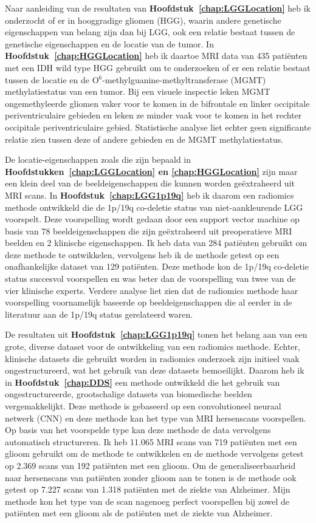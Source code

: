 Naar aanleiding van de resultaten van \textbf{Hoofdstuk~\ref{chap:LGGLocation}} heb ik onderzocht of er in hooggradige gliomen (HGG), waarin andere genetische eigenschappen van belang zijn dan bij LGG, ook een relatie bestaat tussen de genetische eigenschappen en de locatie van de tumor.
In \textbf{Hoofdstuk~\ref{chap:HGGLocation}} heb ik daartoe MRI data van 435 pati{\"e}nten met een IDH wild type HGG gebruikt om te onderzoeken of er een relatie bestaat tussen de locatie en de O$^6$-methylguanine-methyltransferase (MGMT) methylatiestatus van een tumor.
Bij een visuele inspectie leken  MGMT ongemethyleerde gliomen vaker voor te komen in de bifrontale en linker occipitale periventriculaire gebieden en leken ze minder vaak voor te komen in het rechter occipitale periventriculaire gebied.
Statistische analyse liet echter geen significante relatie zien tussen deze of andere gebieden en de MGMT methylatiestatus.

De locatie-eigenschappen zoals die zijn bepaald in \textbf{Hoofdstukken~\ref{chap:LGGLocation} en \ref{chap:HGGLocation}} zijn maar een klein deel van de beeldeigenschappen die kunnen worden ge{\"e}xtraheerd uit MRI scans.
In \textbf{Hoofdstuk~\ref{chap:LGG1p19q}} heb ik daarom een radiomics methode ontwikkeld die de 1p/19q co-deletie status van niet-aankleurende LGG voorspelt.
Deze voorspelling wordt gedaan door een support vector machine op basis van 78 beeldeigenschappen die zijn ge{\"e}xtraheerd uit preoperatieve MRI beelden en 2 klinische eigenschappen.
Ik heb data van 284 pati{\"e}nten gebruikt om deze methode te ontwikkelen, vervolgens heb ik de methode getest op een onafhankelijke dataset van 129 pati{\"e}nten.
Deze methode kon de 1p/19q co-deletie status succesvol voorspellen en was beter dan de voorspelling van twee van de vier klinische experts.
Verdere analyse liet zien dat de radiomics methode haar voorspelling voornamelijk baseerde op beeldeigenschappen die al eerder in de literatuur aan de 1p/19q status gerelateerd waren.

De resultaten uit \textbf{Hoofdstuk~\ref{chap:LGG1p19q}} tonen het belang aan van een grote, diverse dataset voor de ontwikkeling van een radiomics methode.
Echter, klinische datasets die gebruikt worden in radiomics onderzoek zijn initieel vaak ongestructureerd, wat het gebruik van deze datasets bemoeilijkt.
Daarom heb ik in \textbf{Hoofdstuk~\ref{chap:DDS}} een methode ontwikkeld die het gebruik van ongestructureerde, grootschalige datasets van biomedische beelden vergemakkelijkt.
Deze methode is gebaseerd op een convolutioneel neuraal netwerk (CNN) en deze methode kan het type van  MRI hersenscans voorspellen.
Op basis van het voorspelde type kan deze methode de data vervolgens automatisch structureren.
Ik heb 11.065 MRI scans van 719 pati{\"e}nten met een glioom gebruikt om de methode te ontwikkelen en de methode vervolgens getest op 2.369 scans van 192 pati{\"e}nten met een glioom.
Om de generaliseerbaarheid naar hersenscans van pati{\"e}nten zonder glioom aan te tonen is de methode ook getest op 7.227 scans van 1.318 pati{\"e}nten met de ziekte van Alzheimer.
Mijn methode kon het type van de scan nagenoeg perfect voorspellen bij zowel de pati{\"e}nten met een glioom als de pati{\"e}nten met de ziekte van Alzheimer.

